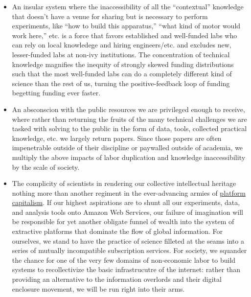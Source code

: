 \begin{itemize}
\tightlist
\item
  An insular system where the inaccessibility of all the ``contextual''
  knowledge \citep{woolKnowledgeNetworksHow2020, barleyBackroomsScienceWork1994}  that doesn't have a venue for
  sharing but is necessary to perform experiments, like ``how to build
  this apparatus,'' ``what kind of motor would work here,'' etc. is a
  force that favors established and well-funded labs who can rely on
  local knowledege and hiring engineers/etc. and excludes new,
  lesser-funded labs at non-ivy institutions. The concentration of
  technical knowledge magnifies the inequity of strongly skewed funding
  distributions such that the most well-funded labs can do a completely
  different kind of science than the rest of us, turning the
  positive-feedback loop of funding begetting funding ever faster.
\item
  An absconscion with the public resources we are privileged enough to
  receive, where rather than returning the fruits of the many technical
  challenges we are tasked with solving to the public in the form of
  data, tools, collected practical knowledge, etc. we largely return
  papers. Since those papers are often impenetrable outside of their
  discipline or paywalled outside of academia, we multiply the above
  impacts of labor duplication and knowledge inaccessibility by the
  scale of society.
\item
  The complicity of scientists in rendering our collective intellectual
  heritage nothing more than another regiment in the ever-advancing
  armies of
  \protect\hyperlink{platforms-industry-capture-and-the-profit-motive}{platform
  capitalism}. If our highest aspirations are to shunt all our
  experiments, data, and analysis tools onto Amazon Web Services, our
  failure of imagination will be responsible for yet another obligate
  funnel of wealth into the system of extractive platforms that dominate
  the flow of global information. For ourselves, we stand to have the
  practice of science filleted at the seams into a series of mutually
  incompatible subscription services. For society, we squander the
  chance for one of the very few domains of non-economic labor to build
  systems to recollectivize the basic infrastrucutre of the internet:
  rather than providing an alternative to the information overlords and
  their digital enclosure movement, we will be run right into their
  arms.
\end{itemize}

